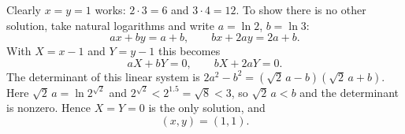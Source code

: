 Clearly $x=y=1$ works: $2\cdot3=6$ and $3\cdot4=12$. To show there is no other solution, take natural logarithms and write $a=\ln2$, $b=\ln3$:
\[ax+by=a+b,\qquad bx+2ay=2a+b.\]
With $X=x-1$ and $Y=y-1$ this becomes
\[aX+bY=0,\qquad bX+2aY=0.\]
The determinant of this linear system is $2a^2-b^2=\left(\sqrt2\,a-b\right)\left(\sqrt2\,a+b\right)$. Here $\sqrt2\,a=\ln2^{\sqrt2}$ and $2^{\sqrt2}<2^{1.5}=\sqrt8<3$, so $\sqrt2\,a<b$ and the determinant is nonzero. Hence $X=Y=0$ is the only solution, and
\[\boxed{(x,y)=(1,1)}.\]
